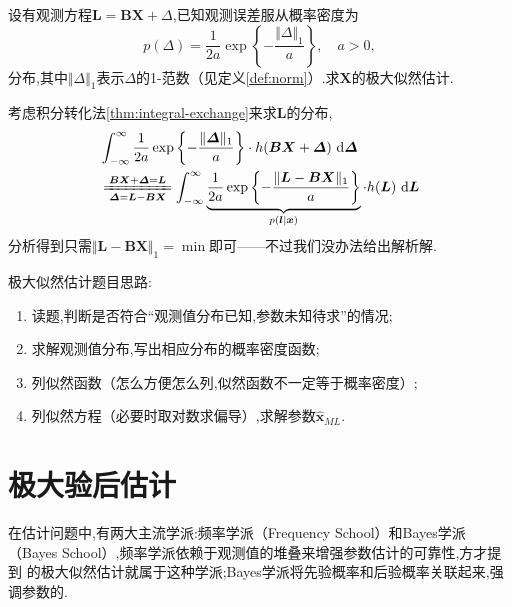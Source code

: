 \documentclass[cn,10pt,citestyle=gb7714-2015,bibstyle=gb7714-2015]{elegantbook}
\newcommand{\md}{\ \mathrm{d}}
\begin{document}
\begin{problem}
  设有观测方程$\bm{L}=\bm{B}\bm{X}+\bm{\varDelta}$,已知观测误差服从概率密度为
  \[
      p(\bm{\varDelta})=\frac{1}{2a}\exp\left\{-\frac{\Vert\bm{\varDelta}\Vert_1}{a}\right\},\quad a>0,
  \]分布,其中$\Vert\bm{\varDelta}\Vert_1$表示$\bm{\varDelta}$的\colorbox{yellow!20}{1-范数}（见定义\ref{def:norm}）.求$\bm{X}$的极大似然估计.
\end{problem}
\begin{solution}
  考虑积分转化法\ref{thm:integral-exchange}来求$\bm{L}$的分布,
  \begin{align*}
    &\int_{-\infty}^{\infty}\frac{1}{2a}\exp\left\{-\frac{\Vert\bm{\varDelta}\Vert_1}{a}\right\}\cdot h(\bm{B}\bm{X}+\bm{\varDelta})\md\bm{\varDelta}\\
    &\xlongequal[\bm{\varDelta}=\bm{L}-\bm{B}\bm{X}]{\bm{B}\bm{X}+\bm{\varDelta}=\bm{L}}\int_{-\infty}^\infty\underbrace{\frac{1}{2a}\exp\left\{-\frac{\Vert\bm{L}-\bm{B}\bm{X}\Vert_1}{a}\right\}}_{p(\bm{l}\mid\bm{x})}\cdot h(\bm{L})\md\bm{L}
  \end{align*}
  分析得到只需$\Vert\bm{L}-\bm{B}\bm{X}\Vert_1=\min$即可——不过我们没办法给出解析解.
\end{solution}
\begin{conclusion}极大似然估计题目思路:
  \begin{enumerate}
    \item 读题,判断是否符合“观测值分布已知,参数未知待求”的情况;
    \item 求解观测值分布,写出相应分布的概率密度函数;
    \item 列似然函数（怎么方便怎么列,似然函数不一定等于概率密度）;
    \item 列似然方程（必要时取对数求偏导）,求解参数$\hat{\bm{x}}_{ML}$.
  \end{enumerate}
\end{conclusion}
\section{极大验后估计}
在估计问题中,有两大主流学派:频率学派（Frequency School）和Bayes学派（Bayes School）,频率学派依赖于观测值的堆叠来增强参数估计的可靠性,方才提到
的极大似然估计就属于这种学派;Bayes学派将先验概率和后验概率关联起来,强调参数的.
\end{document}
